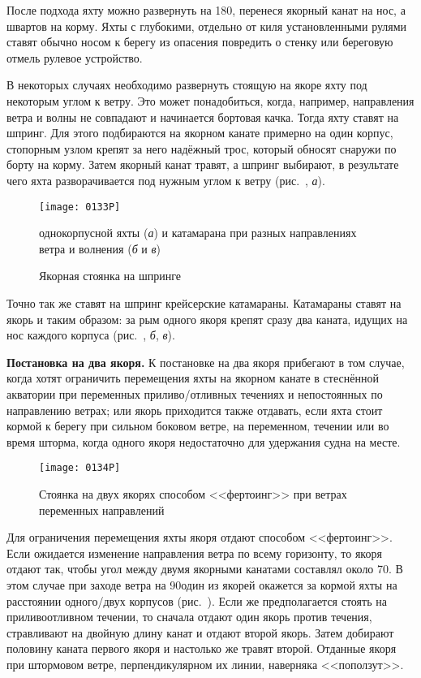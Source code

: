После подхода яхту можно развернуть на 180\gr, перенеся якорный канат
на нос, а швартов на корму. Яхты с глубокими, отдельно от киля
установленными рулями ставят обычно носом к берегу из опасения
повредить о стенку или береговую отмель рулевое устройство.

В некоторых случаях необходимо развернуть стоящую на якоре яхту под
некоторым углом к ветру. Это может понадобиться, когда, например,
направления ветра и волны не совпадают и начинается бортовая
качка. Тогда яхту ставят на шпринг. Для этого подбираются на якорном
канате примерно на один корпус, стопорным узлом крепят за него
надёжный трос, который обносят снаружи по борту на корму. Затем
якорный канат травят, а шпринг выбирают, в результате чего яхта
разворачивается под нужным углом к ветру (рис.~, \textit{а}).

\begin{figure*}[htb]
  \centering{}
  \texttt{[image: 0133P]}
  \caption{Якорная стоянка на шпринге}
  \label{fig:133}
  \small
  \centering{}
  однокорпусной яхты (\textit{а}) и катамарана при разных направлениях ветра и волнения (\textit{б} и \textit{в})
\end{figure*}

Точно так же ставят на шпринг крейсерские катамараны. Катамараны
ставят на якорь и таким образом: за рым одного якоря крепят сразу два
каната, идущих на нос каждого корпуса (рис.~, \textit{б},
\textit{в}).

\textbf{Постановка на два якоря.} К постановке на два якоря прибегают
в том случае, когда хотят ограничить перемещения яхты на якорном
канате в стеснённой акватории при переменных приливо\-/отливных
течениях и непостоянных по направлению ветрах; или якорь приходится
также отдавать, если яхта стоит кормой к берегу при сильном боковом
ветре, на переменном, течении или во время шторма, когда одного якоря
недостаточно для удержания судна на месте.

\begin{figure*}[htb]
  \centering{}
  \texttt{[image: 0134P]}
  \caption{Стоянка на двух якорях способом <<фертоинг>> при ветрах
    переменных направлений}
  \label{fig:134}
\end{figure*}

Для ограничения перемещения яхты якоря отдают способом
<<фертоинг>>. Если ожидается изменение направления ветра по всему
горизонту, то якоря отдают так, чтобы угол между двумя якорными
канатами составлял около 70\gr. В этом случае при заходе ветра
на 90\gr один из якорей окажется за кормой яхты на расстоянии
одного\-/двух корпусов (рис.~). Если же предполагается стоять
на приливоотливном течении, то сначала отдают один якорь против
течения, стравливают на двойную длину канат и отдают второй
якорь. Затем добирают половину каната первого якоря и настолько же
травят второй. Отданные якоря при штормовом ветре, перпендикулярном их
линии, наверняка <<поползут>>.

